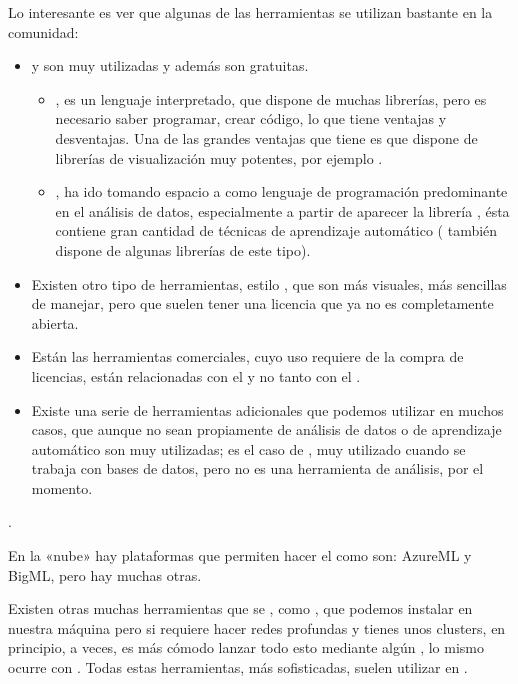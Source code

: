 Lo interesante es ver que algunas de las herramientas se utilizan bastante en la comunidad:
\begin{itemize}
    \item {} y  son muy utilizadas y además son gratuitas.
    \begin{itemize}
        \item {}, es un lenguaje interpretado, que dispone de muchas librerías, pero es necesario saber programar, crear código, lo que tiene ventajas y desventajas. Una de las grandes ventajas que tiene es que dispone de librerías de visualización muy potentes, por ejemplo .
        \item {}, ha ido tomando espacio a  como lenguaje de programación predominante en el análisis de datos, especialmente a partir de aparecer la librería , ésta contiene gran cantidad de técnicas de aprendizaje automático ( también dispone de algunas librerías de este tipo).
    \end{itemize}
    \item Existen otro tipo de herramientas, estilo , que son más visuales, más sencillas de manejar, pero que suelen tener una licencia que ya no es completamente abierta.
    \item Están las herramientas comerciales, cuyo uso requiere de la compra de licencias, están relacionadas con el  y no tanto con el .
    \item Existe una serie de herramientas adicionales que podemos utilizar en muchos casos, que aunque no sean propiamente de análisis de datos o de aprendizaje automático son muy utilizadas; es el caso de , muy utilizado cuando se trabaja con bases de datos, pero no es una herramienta de análisis, por el momento.
\end{itemize}. 

En la «nube» hay plataformas que permiten hacer el  como son: AzureML y BigML, pero hay muchas otras.

Existen otras muchas herramientas que se , como , que podemos instalar en nuestra máquina pero si requiere hacer redes profundas y tienes unos clusters, en principio, a veces, es más cómodo lanzar todo esto mediante algún , lo mismo ocurre con . Todas estas herramientas, más sofisticadas, suelen utilizar en .